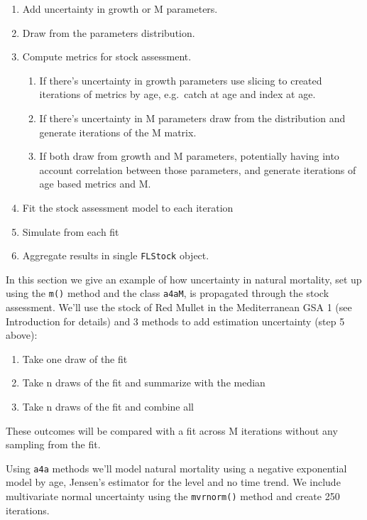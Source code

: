 \documentclass[
]{book}
\providecommand{\tightlist}{%
  \setlength{\itemsep}{0pt}\setlength{\parskip}{0pt}}
\begin{document}
\begin{enumerate}
\def\labelenumi{\arabic{enumi}.}
\tightlist
\item
  Add uncertainty in growth or M parameters.
\item
  Draw from the parameters distribution.
\item
  Compute metrics for stock assessment.

  \begin{enumerate}
  \def\labelenumii{\arabic{enumii}.}
  \tightlist
  \item
    If there's uncertainty in growth parameters use slicing to created iterations of metrics by age, e.g.~catch at age and index at age.
  \item
    If there's uncertainty in M parameters draw from the distribution and generate iterations of the M matrix.
  \item
    If both draw from growth and M parameters, potentially having into account correlation between those parameters, and generate iterations of age based metrics and M.
  \end{enumerate}
\item
  Fit the stock assessment model to each iteration
\item
  Simulate from each fit
\item
  Aggregate results in single \texttt{FLStock} object.
\end{enumerate}

In this section we give an example of how uncertainty in natural mortality, set up using the \texttt{m()} method and the class \texttt{a4aM}, is propagated through the stock assessment. We'll use the stock of Red Mullet in the Mediterranean GSA 1 (see Introduction for details) and 3 methods to add estimation uncertainty (step 5 above):

\begin{enumerate}
\def\labelenumi{\arabic{enumi}.}
\tightlist
\item
  Take one draw of the fit
\item
  Take n draws of the fit and summarize with the median
\item
  Take n draws of the fit and combine all
\end{enumerate}

These outcomes will be compared with a fit across M iterations without any sampling from the fit.

Using \texttt{a4a} methods we'll model natural mortality using a negative exponential model by age, Jensen's estimator for the level and no time trend. We include multivariate normal uncertainty using the \texttt{mvrnorm()} method and create 250 iterations.
\end{document}
